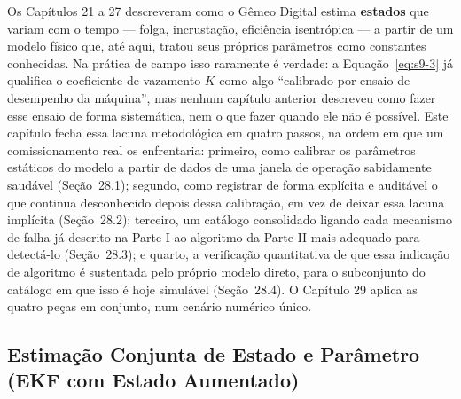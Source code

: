 \documentclass[12pt,a4paper]{article}
\numberwithin{equation}{section}
\numberwithin{table}{section}
\numberwithin{figure}{section}
\begin{document}
{Os Capítulos 21 a 27 descreveram como o Gêmeo Digital estima \textbf{estados} que variam com o tempo — folga, incrustação, eficiência isentrópica — a partir de um modelo físico que, até aqui, tratou seus próprios parâmetros como constantes conhecidas. Na prática de campo isso raramente é verdade: a Equação~\eqref{eq:s9-3} já qualifica o coeficiente de vazamento $K$ como algo ``calibrado por ensaio de desempenho da máquina'', mas nenhum capítulo anterior descreveu como fazer esse ensaio de forma sistemática, nem o que fazer quando ele não é possível. Este capítulo fecha essa lacuna metodológica em quatro passos, na ordem em que um comissionamento real os enfrentaria: primeiro, como calibrar os parâmetros estáticos do modelo a partir de dados de uma janela de operação sabidamente saudável (Seção~28.1); segundo, como registrar de forma explícita e auditável o que continua desconhecido depois dessa calibração, em vez de deixar essa lacuna implícita (Seção~28.2); terceiro, um catálogo consolidado ligando cada mecanismo de falha já descrito na Parte I ao algoritmo da Parte II mais adequado para detectá-lo (Seção~28.3); e quarto, a verificação quantitativa de que essa indicação de algoritmo é sustentada pelo próprio modelo direto, para o subconjunto do catálogo em que isso é hoje simulável (Seção~28.4). O Capítulo 29 aplica as quatro peças em conjunto, num cenário numérico único.

\subsection{Estimação Conjunta de Estado e Parâmetro (EKF com Estado Aumentado)}

}
\end{document}
